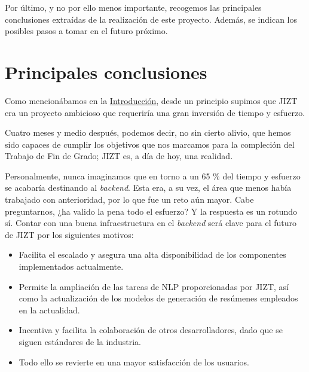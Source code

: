 
\vspace{-1cm}
Por último, y no por ello menos importante, recogemos las principales conclusiones extraídas de la realización de este proyecto. Además, se indican los posibles pasos a tomar en el futuro próximo.

\section{Principales conclusiones}

Como mencionábamos en la \hyperref[chapter:intro]{Introducción}, desde un principio supimos que JIZT era un proyecto ambicioso que requeriría una gran inversión de tiempo y esfuerzo.

Cuatro meses y medio después, podemos decir, no sin cierto alivio, que hemos sido capaces de cumplir los objetivos que nos marcamos para la compleción del Trabajo de Fin de Grado; JIZT es, a día de hoy, una realidad.

Personalmente, nunca imaginamos que en torno a un 65 \% del tiempo y esfuerzo se acabaría destinando al \emph{backend}. Esta era, a su vez, el área que menos había trabajado con anterioridad, por lo que fue un reto aún mayor. Cabe preguntarnos, ¿ha valido la pena todo el esfuerzo? Y la respuesta es un rotundo sí. Contar con una buena infraestructura en el \emph{backend} será clave para el futuro de JIZT por los siguientes motivos:

\vspace{-0.2cm}
\begin{itemize}
	\item [\textbullet] Facilita el escalado y asegura una alta disponibilidad de los componentes implementados actualmente.
	\vspace{-0.2cm}
	\item [\textbullet] Permite la ampliación de las tareas de NLP proporcionadas por JIZT, así como la actualización de los modelos de generación de resúmenes empleados en la actualidad.
	\vspace{-0.2cm}
	\item [\textbullet] Incentiva y facilita la colaboración de otros desarrolladores, dado que se siguen estándares de la industria.
	\vspace{-0.2cm}
	\item [\textbullet] Todo ello se revierte en una mayor satisfacción de los usuarios.
\end{itemize}

